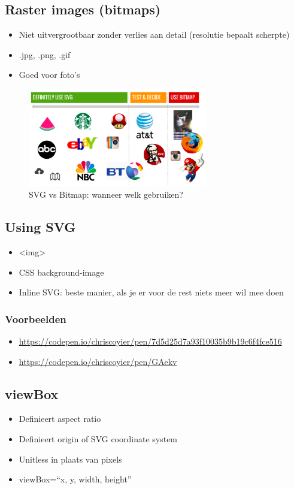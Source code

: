 \documentclass{article}
\begin{document}
\subsection{Raster images (bitmaps)}
\begin{itemize}
    \item Niet uitvergrootbaar zonder verlies aan detail (resolutie bepaalt scherpte)
    \item .jpg, .png, .gif
    \item Goed voor foto's
\end{itemize}

\begin{figure}[H]
    \centering
    \includegraphics[width=0.7\textwidth]{img/svg-vs-bitmap.png}
    \caption{SVG vs Bitmap: wanneer welk gebruiken?}
\end{figure}

\subsection{Using SVG}
\begin{itemize}
    \item <img>
    \item CSS background-image
    \item Inline SVG: beste manier, als je er voor de rest niets meer wil mee doen
\end{itemize}

\subsubsection{Voorbeelden}

\begin{itemize}
    \item \url{https://codepen.io/chriscoyier/pen/7d5d25d7a93f10035b9b19c6f4fce516}
    \item \url{https://codepen.io/chriscoyier/pen/GAekv}
\end{itemize}


\subsection{viewBox}
\begin{itemize}
    \item Definieert aspect ratio
    \item Definieert origin of SVG coordinate system
    \item Unitless in plaats van pixels
    \item viewBox=“x, y, width, height”
\end{itemize}
\end{document}
